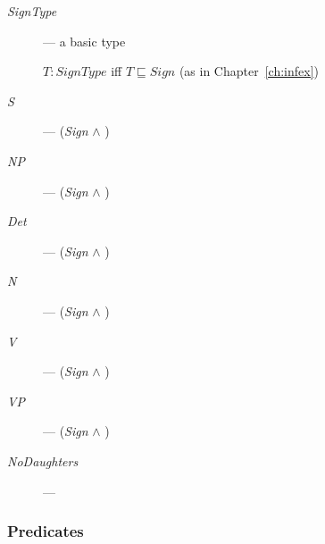 \begin{description}
  
\item[\textnormal{\textit{SignType}}] --- a basic type

  $T:\textit{SignType}$ iff $T\sqsubseteq\textit{Sign}$ (as in
  Chapter~\ref{ch:infex})

  
\item[\textnormal{\textit{S}}] --- (\textit{Sign} \d{$\wedge$}
  )
  
\item[\textnormal{\textit{NP}}] --- (\textit{Sign} \d{$\wedge$}
  )

  
\item[\textnormal{\textit{Det}}] --- (\textit{Sign} \d{$\wedge$}
  )
  
\item[\textnormal{\textit{N}}] --- (\textit{Sign} \d{$\wedge$}
  )
  
\item[\textnormal{\textit{V}}] --- (\textit{Sign} \d{$\wedge$}
  )
  
\item[\textnormal{\textit{VP}}] --- (\textit{Sign} \d{$\wedge$}
  )

  
\item[\textnormal{\textit{NoDaughters}}] ---

  


\end{description}

\subsubsection{Predicates}


